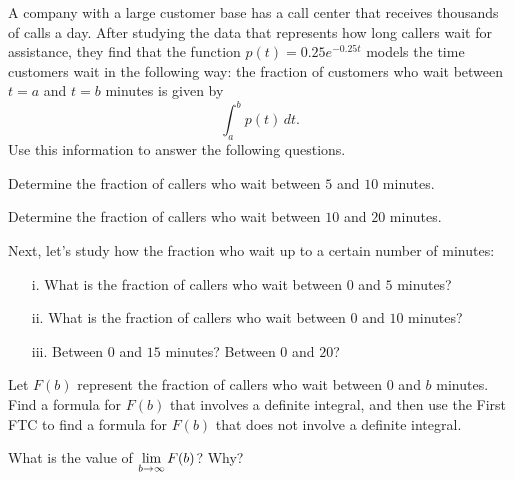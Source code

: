 \begin{pa} \label{PA:5.5}  A company with a large customer base has a call center that receives thousands of calls a day.  After studying the data that represents how long callers wait for assistance, they find that the function $p(t) = 0.25e^{-0.25t}$ models the time customers wait in the following way:  the fraction of customers who wait between $t = a$ and $t = b$ minutes is given by
$$\int_a^b p(t) \, dt.$$  
Use this information to answer the following questions.
\ba
	\item Determine the fraction of callers who wait between $5$ and $10$ minutes.
	\item Determine the fraction of callers who wait between $10$ and $20$ minutes.
	\item Next, let's study how the fraction who wait up to a certain number of minutes:
	\begin{itemize}
		\item[i.] What is the fraction of callers who wait between $0$ and $5$ minutes?
		\item[ii.] What is the fraction of callers who wait between $0$ and $10$ minutes?
		\item[iii.] Between $0$ and $15$ minutes?  Between $0$ and $20$? 
	\end{itemize}
	\item Let $F(b)$ represent the fraction of callers who wait between $0$ and $b$ minutes.  Find a formula for $F(b)$ that involves a definite integral, and then use the First FTC to find a formula for $F(b)$ that does not involve a definite integral.
	\item What is the value of $\displaystyle \lim_{b \to \infty} F(b)$?  Why?
\ea
\end{pa} 
\afterpa